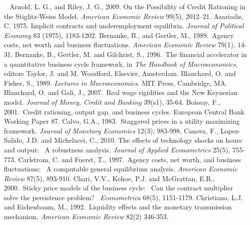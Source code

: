 \documentclass{article}
\begin{document}
\bigskip\ \newline
Arnold, L. G., and Riley, J. G., 2009. On the Possibility of Credit
Rationing in the Stiglitz-Weiss Model. \textit{American Economic Review}
99(5), 2012--21.\bigskip \newline
Azariadis, C. 1975. Implicit contracts and underemployment equilibria.
\textit{Journal of Political Economy} 83 (1975), 1183-1202.\bigskip \newline
Bernanke, B., and Gertler, M., 1989.\ Agency costs, net worth and business
fluctuations. \textit{American Economic Review }79(1), 14-31.\bigskip
\newline
Bernanke, B., Gertler, M. and Gilchrist, S., 1996.\ The financial
accelerator in a quantitative business cycle framework, in \textit{The
Handbook of Macroeconomics}, editors Taylor, J. and M. Woodford, Elsevier,
Amsterdam.\bigskip \newline
Blanchard, O. and Fisher, S., 1989. \textit{Lectures in Macroeconomics}. MIT
Press, Cambridge, MA.\bigskip \newline
Blanchard, O. and Gali, J., 2007.\ Real wage rigidities and the New
Keynesian model. \textit{Journal of Money, Credit and Banking} 39(s1),
35-64.\bigskip \newline
Boissay, F., 2001.\ Credit rationing, output gap, and business cycles.
European Central Bank Working Paper 87.\bigskip \newline
Calvo, G.A., 1983.\ Staggered prices in a utility maximizing framework.
\textit{Journal of Monetary Economics }12(3), 983-998.\bigskip \newline
Canova, F., Lopez-Salido, J.D. and Michelacci, C., 2010. The effects of
technology shocks on hours and output: \ A robustness analysis. \textit{%
Journal of Applied Econometrics} 25(5), 755-773.\bigskip \newline
Carlstrom, C. and Fuerst, T., 1997.\ Agency costs, net worth, and business
fluctuations: \ A computable general equilibrium analysis. \textit{American
Economic Review }87(5), 893-910.\bigskip \newline
Chari, V.V., Kehoe, P.J. and McGrattan, E.R., 2000.\ Sticky price models of
the business cycle: \ Can the contract multiplier solve the persistence
problem? \ \textit{Econometrica }68(5), 1151-1179.\bigskip \newline
Christiano, L.J. and Eichenbaum, M., 1992.\ Liquidity effects and the
monetary transmission mechanism. \textit{American Economic Review} 82(2)
346-353.\bigskip \newline
\end{document}

